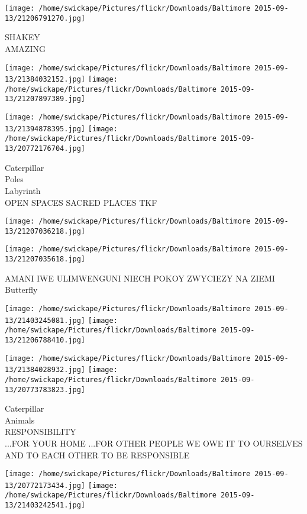 \documentclass[10pt,letterpaper]{article}
\begin{document}
\vspace{0.25in}
\texttt{[image: /home/swickape/Pictures/flickr/Downloads/Baltimore 2015-09-13/21206791270.jpg]}

SHAKEY\\
AMAZING
\pagebreak

\texttt{[image: /home/swickape/Pictures/flickr/Downloads/Baltimore 2015-09-13/21384032152.jpg]}
\texttt{[image: /home/swickape/Pictures/flickr/Downloads/Baltimore 2015-09-13/21207897389.jpg]}

\texttt{[image: /home/swickape/Pictures/flickr/Downloads/Baltimore 2015-09-13/21394878395.jpg]}
\texttt{[image: /home/swickape/Pictures/flickr/Downloads/Baltimore 2015-09-13/20772176704.jpg]}

Caterpillar\\
Poles\\
Labyrinth\\
OPEN SPACES SACRED PLACES TKF
\pagebreak

\texttt{[image: /home/swickape/Pictures/flickr/Downloads/Baltimore 2015-09-13/21207036218.jpg]}

\vspace{0.25in}
\texttt{[image: /home/swickape/Pictures/flickr/Downloads/Baltimore 2015-09-13/21207035618.jpg]}

AMANI IWE ULIMWENGUNI NIECH POKOY ZWYCIEZY NA ZIEMI\\
Butterfly
\pagebreak

\texttt{[image: /home/swickape/Pictures/flickr/Downloads/Baltimore 2015-09-13/21403245081.jpg]}
\texttt{[image: /home/swickape/Pictures/flickr/Downloads/Baltimore 2015-09-13/21206788410.jpg]}

\texttt{[image: /home/swickape/Pictures/flickr/Downloads/Baltimore 2015-09-13/21384028932.jpg]}
\texttt{[image: /home/swickape/Pictures/flickr/Downloads/Baltimore 2015-09-13/20773783823.jpg]}

Caterpillar\\
Animals\\
RESPONSIBILITY\\
...FOR YOUR HOME ...FOR OTHER PEOPLE WE OWE IT TO OURSELVES AND TO EACH OTHER TO BE RESPONSIBLE
\pagebreak

\texttt{[image: /home/swickape/Pictures/flickr/Downloads/Baltimore 2015-09-13/20772173434.jpg]}
\texttt{[image: /home/swickape/Pictures/flickr/Downloads/Baltimore 2015-09-13/21403242541.jpg]}
\end{document}
